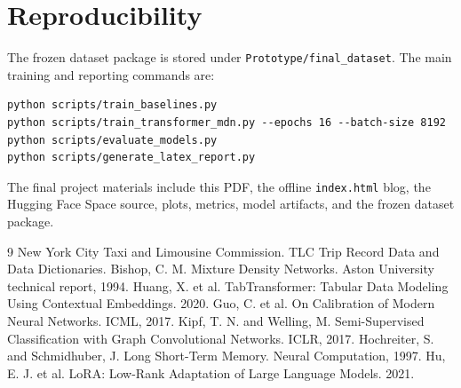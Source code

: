 \documentclass[11pt]{article}
\begin{document}
\section{Reproducibility}
The frozen dataset package is stored under \texttt{Prototype/final\_dataset}. The main training and reporting commands are:
\begin{verbatim}
python scripts/train_baselines.py
python scripts/train_transformer_mdn.py --epochs 16 --batch-size 8192
python scripts/evaluate_models.py
python scripts/generate_latex_report.py
\end{verbatim}
The final project materials include this PDF, the offline \texttt{index.html} blog, the Hugging Face Space source, plots, metrics, model artifacts, and the frozen dataset package.

\begin{thebibliography}{9}
 New York City Taxi and Limousine Commission. TLC Trip Record Data and Data Dictionaries.
 Bishop, C. M. Mixture Density Networks. Aston University technical report, 1994.
 Huang, X. et al. TabTransformer: Tabular Data Modeling Using Contextual Embeddings. 2020.
 Guo, C. et al. On Calibration of Modern Neural Networks. ICML, 2017.
 Kipf, T. N. and Welling, M. Semi-Supervised Classification with Graph Convolutional Networks. ICLR, 2017.
 Hochreiter, S. and Schmidhuber, J. Long Short-Term Memory. Neural Computation, 1997.
 Hu, E. J. et al. LoRA: Low-Rank Adaptation of Large Language Models. 2021.
\end{thebibliography}
\end{document}

